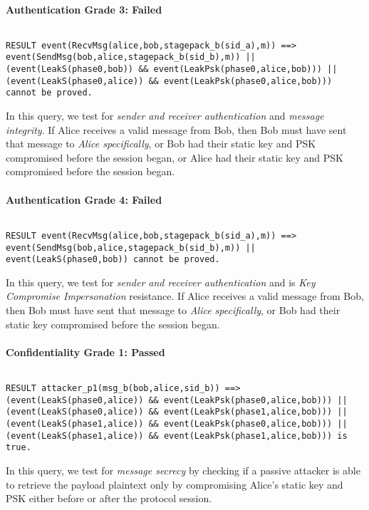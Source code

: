 \paragraph{Authentication Grade 3: Failed}$ $
\begin{lstlisting}
RESULT event(RecvMsg(alice,bob,stagepack_b(sid_a),m)) ==> event(SendMsg(bob,alice,stagepack_b(sid_b),m)) || (event(LeakS(phase0,bob)) && event(LeakPsk(phase0,alice,bob))) || (event(LeakS(phase0,alice)) && event(LeakPsk(phase0,alice,bob))) cannot be proved.
\end{lstlisting}

In this query, we test for \emph{sender and receiver authentication} and \emph{message integrity}. If Alice receives a valid message from Bob, then Bob must have sent that message to \emph{Alice specifically}, or Bob had their static key and PSK compromised before the session began, or Alice had their static key and PSK compromised before the session began.


\paragraph{Authentication Grade 4: Failed}$ $
\begin{lstlisting}
RESULT event(RecvMsg(alice,bob,stagepack_b(sid_a),m)) ==> event(SendMsg(bob,alice,stagepack_b(sid_b),m)) || event(LeakS(phase0,bob)) cannot be proved.
\end{lstlisting}

In this query, we test for \emph{sender and receiver authentication} and is \emph{Key Compromise Impersonation} resistance. If Alice receives a valid message from Bob, then Bob must have sent that message to \emph{Alice specifically}, or Bob had their static key compromised before the session began.


\paragraph{Confidentiality Grade 1: Passed}$ $
\begin{lstlisting}
RESULT attacker_p1(msg_b(bob,alice,sid_b)) ==> (event(LeakS(phase0,alice)) && event(LeakPsk(phase0,alice,bob))) || (event(LeakS(phase0,alice)) && event(LeakPsk(phase1,alice,bob))) || (event(LeakS(phase1,alice)) && event(LeakPsk(phase0,alice,bob))) || (event(LeakS(phase1,alice)) && event(LeakPsk(phase1,alice,bob))) is true.
\end{lstlisting}

In this query, we test for \emph{message secrecy} by checking if a passive attacker is able to retrieve the payload plaintext only by compromising Alice's static key and PSK either before or after the protocol session.


